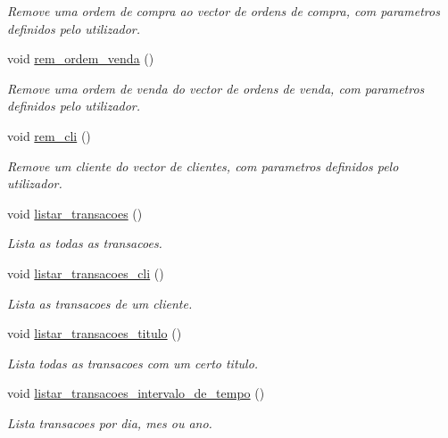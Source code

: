 \begin{DoxyCompactItemize}
\begin{DoxyCompactList}\small\item\em Remove uma ordem de compra ao vector de ordens de compra, com parametros definidos pelo utilizador. \end{DoxyCompactList}\item 
void \hyperlink{class_bolsa_a293578d28d9de84f85844025b47fc505}{rem\+\_\+ordem\+\_\+venda} ()
\begin{DoxyCompactList}\small\item\em Remove uma ordem de venda do vector de ordens de venda, com parametros definidos pelo utilizador. \end{DoxyCompactList}\item 
void \hyperlink{class_bolsa_a3fe70cc3887113b99e09457a62d3fb83}{rem\+\_\+cli} ()
\begin{DoxyCompactList}\small\item\em Remove um cliente do vector de clientes, com parametros definidos pelo utilizador. \end{DoxyCompactList}\item 
void \hyperlink{class_bolsa_a4676ec9295a14426f3c70e91dd36fde1}{listar\+\_\+transacoes} ()
\begin{DoxyCompactList}\small\item\em Lista as todas as transacoes. \end{DoxyCompactList}\item 
void \hyperlink{class_bolsa_ad96a358bf03c103f55b8139da8a0d61a}{listar\+\_\+transacoes\+\_\+cli} ()
\begin{DoxyCompactList}\small\item\em Lista as transacoes de um cliente. \end{DoxyCompactList}\item 
void \hyperlink{class_bolsa_aeac084d57bf9382c83516f1f0c043936}{listar\+\_\+transacoes\+\_\+titulo} ()
\begin{DoxyCompactList}\small\item\em Lista todas as transacoes com um certo titulo. \end{DoxyCompactList}\item 
void \hyperlink{class_bolsa_acb012fa60aa074fd861168ca3aedadd0}{listar\+\_\+transacoes\+\_\+intervalo\+\_\+de\+\_\+tempo} ()
\begin{DoxyCompactList}\small\item\em Lista transacoes por dia, mes ou ano. \end{DoxyCompactList}\item 

\end{DoxyCompactItemize}
